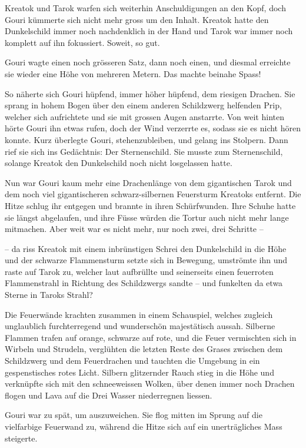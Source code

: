 Kreatok und Tarok warfen sich weiterhin Anschuldigungen an den Kopf, doch Gouri kümmerte sich nicht mehr gross um den Inhalt. Kreatok hatte den Dunkelschild immer noch nachdenklich in der Hand und Tarok war immer noch komplett auf ihn fokussiert. Soweit, so gut.

Gouri wagte einen noch grösseren Satz, dann noch einen, und diesmal erreichte sie wieder eine Höhe von mehreren Metern. Das machte beinahe Spass!

So näherte sich Gouri hüpfend, immer höher hüpfend, dem riesigen Drachen. Sie sprang in hohem Bogen über den einem anderen Schildzwerg helfenden Prip, welcher sich aufrichtete und sie mit grossen Augen anstarrte. Von weit hinten hörte Gouri ihn etwas rufen, doch der Wind verzerrte es, sodass sie es nicht hören konnte. Kurz überlegte Gouri, stehenzubleiben, und gelang ins Stolpern. Dann rief sie sich ins Gedächtnis: Der Sternenschild. Sie musste zum Sternenschild, solange Kreatok den Dunkelschild noch nicht losgelassen hatte.

Nun war Gouri kaum mehr eine Drachenlänge von dem gigantischen Tarok und dem noch viel gigantischeren schwarz-silbernen Feuersturm Kreatoks entfernt. Die Hitze schlug ihr entgegen und brannte in ihren Schürfwunden. Ihre Schuhe hatte sie längst abgelaufen, und ihre Füsse würden die Tortur auch nicht mehr lange mitmachen. Aber weit war es nicht mehr, nur noch zwei, drei Schritte –

– da riss Kreatok mit einem inbrünstigen Schrei den Dunkelschild in die Höhe und der schwarze Flammensturm setzte sich in Bewegung, umströmte ihn und raste auf Tarok zu, welcher laut aufbrüllte und seinerseits einen feuerroten Flammenstrahl in Richtung des Schildzwergs sandte – und funkelten da etwa Sterne in Taroks Strahl?

Die Feuerwände krachten zusammen in einem Schauspiel, welches zugleich unglaublich furchterregend und wunderschön majestätisch aussah. Silberne Flammen trafen auf orange, schwarze auf rote, und die Feuer vermischten sich in Wirbeln und Strudeln, verglühten die letzten Reste des Grases zwischen dem Schildzwerg und dem Feuerdrachen und tauchten die Umgebung in ein gespenstisches rotes Licht. Silbern glitzernder Rauch stieg in die Höhe und verknüpfte sich mit den schneeweissen Wolken, über denen immer noch Drachen flogen und Lava auf die Drei Wasser niederregnen liessen.

Gouri war zu spät, um auszuweichen. Sie flog mitten im Sprung auf die vielfarbige Feuerwand zu, während die Hitze sich auf ein unerträgliches Mass steigerte.

